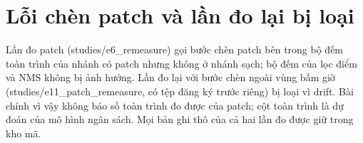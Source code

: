 \documentclass[11pt,a4paper]{article}
\begin{document}
\section{Lỗi chèn patch và lần đo lại bị loại}
Lần đo patch (studies/e6\_remeasure) gọi bước chèn patch bên trong bộ đếm toàn trình của nhánh có patch nhưng không ở nhánh sạch; bộ đếm của lọc điểm và NMS không bị ảnh hưởng. Lần đo lại với bước chèn ngoài vùng bấm giờ (studies/e11\_patch\_remeasure, có tệp đăng ký trước riêng) bị loại vì drift. Bài chính vì vậy không báo số toàn trình đo được của patch; cột toàn trình là dự đoán của mô hình ngân sách. Mọi bản ghi thô của cả hai lần đo được giữ trong kho mã.
\end{document}
